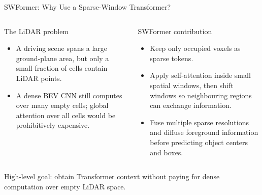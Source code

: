 \documentclass[aspectratio=169,10pt]{beamer}
\begin{document}
\begin{frame}{SWFormer: Why Use a Sparse-Window Transformer?}
\begin{columns}[T,onlytextwidth]
\begin{block}{The LiDAR problem}
\begin{itemize}\setlength{\itemsep}{3pt}
  \item A driving scene spans a large ground-plane area, but only a small
  fraction of cells contain LiDAR points.
  \item A dense BEV CNN still computes over many empty cells; global attention
  over all cells would be prohibitively expensive.
\end{itemize}
\end{block}

\begin{block}{SWFormer contribution~\cite{swformer}}
\begin{itemize}\setlength{\itemsep}{3pt}
  \item Keep only occupied voxels as sparse tokens.
  \item Apply self-attention inside small spatial windows, then shift windows
  so neighbouring regions can exchange information.
  \item Fuse multiple sparse resolutions and diffuse foreground information
  before predicting object centers and boxes.
\end{itemize}
\end{block}
\end{columns}

\vspace{3mm}
\centering
\alert{High-level goal:} obtain Transformer context without paying for dense
computation over empty LiDAR space.
\end{frame}
\end{document}
